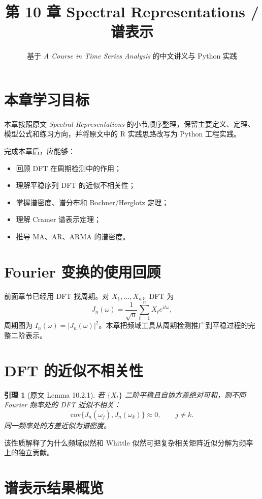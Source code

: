 \documentclass[11pt,a4paper]{ctexart}
\title{第 10 章 \quad Spectral Representations / 谱表示}
\author{基于 \textit{A Course in Time Series Analysis} 的中文讲义与 Python 实践}
\date{}
\newtheorem{lemma}{引理}[section]
\begin{document}
\maketitle

\section*{本章学习目标}

本章按照原文 \textit{Spectral Representations} 的小节顺序整理，保留主要定义、定理、模型公式和练习方向，并将原文中的 R 实践思路改写为 Python 工程实践。

完成本章后，应能够：
\begin{itemize}
  \item 回顾 DFT 在周期检测中的作用；
  \item 理解平稳序列 DFT 的近似不相关性；
  \item 掌握谱密度、谱分布和 Bochner/Herglotz 定理；
  \item 理解 Cramer 谱表示定理；
  \item 推导 MA、AR、ARMA 的谱密度。
\end{itemize}

\section{Fourier 变换的使用回顾}

前面章节已经用 DFT 找周期。对 \(X_1,\ldots,X_n\)，DFT 为
\[
  J_n(\omega)=\frac1{\sqrt n}\sum_{t=1}^n X_t e^{it\omega},
\]
周期图为 \(I_n(\omega)=|J_n(\omega)|^2\)。本章把频域工具从周期检测推广到平稳过程的完整二阶表示。

\section{DFT 的近似不相关性}

\begin{lemma}[原文 Lemma 10.2.1]
若 \(\{X_t\}\) 二阶平稳且自协方差绝对可和，则不同 Fourier 频率处的 DFT 近似不相关：
\[
  \mathrm{cov}\{J_n(\omega_j),J_n(\omega_k)\}\approx0,\qquad j\ne k.
\]
同一频率处的方差近似为谱密度。
\end{lemma}

该性质解释了为什么频域似然和 Whittle 似然可把复杂相关矩阵近似分解为频率上的独立贡献。

\section{谱表示结果概览}
\end{document}
